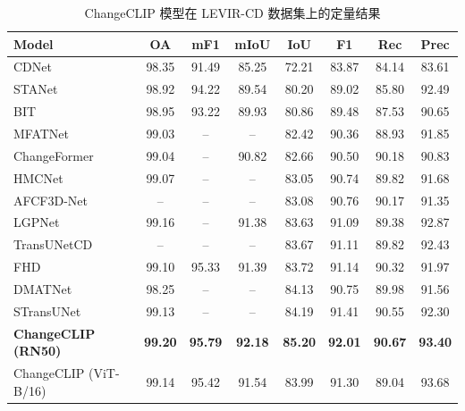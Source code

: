 \begin{table}[!htbp]
  \centering
  \caption{ChangeCLIP 模型在 LEVIR-CD 数据集上的定量结果}
  \label{tab:changeclip_levir}
  \begin{tabular*}{\textwidth}{@{\extracolsep{\fill}} l c c c c c c c}
    \toprule
    Model & OA & mF1 & mIoU & IoU & F1 & Rec & Prec \\
    \midrule
    CDNet~\cite{Alcantarilla2016StreetviewCD}                         & 98.35 & 91.49 & 85.25 & 72.21 & 83.87 & 84.14 & 83.61 \\
    STANet~\cite{chen_spatial-temporal_2020}                        & 98.92 & 94.22 & 89.54 & 80.20 & 89.02 & 85.80 & 92.49 \\
    BIT~\cite{chen_remote_2022}                           & 98.95 & 93.22 & 89.93 & 80.86 & 89.48 & 87.53 & 90.65 \\
    MFATNet~\cite{Mao2022MFATNetMF}                       & 99.03 & --    & --    & 82.42 & 90.36 & 88.93 & 91.85 \\
    ChangeFormer~\cite{bandara2022transformer}                  & 99.04 & --    & 90.82 & 82.66 & 90.50 & 90.18 & 90.83 \\
    HMCNet~\cite{Wang2022HMCNetHE}                        & 99.07 & --    & --    & 83.05 & 90.74 & 89.82 & 91.68 \\
    AFCF3D-Net~\cite{Ye2023AdjacentLevelFC}                    & --    & --    & --    & 83.08 & 90.76 & 90.17 & 91.35 \\
    LGPNet~\cite{Liu2022BuildingCD}                        & 99.16 & --    & 91.38 & 83.63 & 91.09 & 89.38 & 92.87 \\
    TransUNetCD                   & --    & --    & --    & 83.67 & 91.11 & 89.82 & 92.43 \\
    FHD~\cite{pei_feature_2022}                           & 99.10 & 95.33 & 91.39 & 83.72 & 91.14 & 90.32 & 91.97 \\
    DMATNet~\cite{Song2022RemoteSI}                       & 98.25 & --    & --    & 84.13 & 90.75 & 89.98 & 91.56 \\
    STransUNet~\cite{Yuan2022STransUNetAS}                    & 99.13 & --    & --    & 84.19 & 91.41 & 90.55 & 92.30 \\
    \textbf{ChangeCLIP (RN50)}    & \textbf{99.20} & \textbf{95.79} & \textbf{92.18} & \textbf{85.20} & \textbf{92.01} & \textbf{90.67} & \textbf{93.40} \\
    ChangeCLIP (ViT-B/16)         & 99.14 & 95.42 & 91.54 & 83.99 & 91.30 & 89.04 & 93.68 \\
    \bottomrule
  \end{tabular*}
\end{table}

